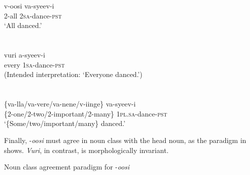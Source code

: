 \documentclass[output=paper]{langsci/langscibook}
\begin{document}
\chapter[  ]{\textit{  }}
\chapter{}
\gll v-oosi    va-syeev-i      \\
     2-all    2\textsc{sa}{}-dance-\textsc{pst}\\
\glt ‘All danced.’
\z

\chapter{}
\gll *vuri    a-syeev-i  \\
     every    1\textsc{sa}{}-dance-\textsc{pst}\\
\glt (Intended interpretation: ‘Everyone danced.’)
\z

\chapter[]{\scshape }
\gll \{va-lla/va-vere/va-nene/v-iinge\}  va-syeev-i\\
     \{2-one/2-two/2-important/2-many\}  1\textsc{pl}.\textsc{sa}{}-dance-\textsc{pst}\\
\glt ‘\{Some/two/important/many\} danced.’
\z

  Finally, -\textit{oosi} must agree in noun class with the head noun, as the paradigm in  shows. \textit{Vuri}, in contrast, is morphologically invariant.

\begin{stylelsTableHeading}%
\begin{table}
\caption{Noun class agreement paradigm for -\textit{oosi}}
\label{tab:1}
\end{table}\end{stylelsTableHeading}
\end{document}
